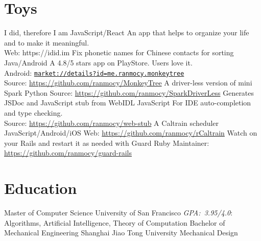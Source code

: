 \documentclass[]{friggeri-cv}
\begin{document}
\section{Toys}

\begin{entrylist}
  {I did, therefore I am}
  {JavaScript/React}
  {
    An app that helps to organize your life and to make it meaningful.\\
    Web: https://idid.im
  }
  {Fix phonetic names for Chinese contacts for sorting}
  {Java/Android}
  {
    A 4.8/5 stars app on PlayStore. Users love it.\\
    Android: \href{https://play.google.com/store/apps/details?id=me.ranmocy.monkeytree}{\texttt{market://details?id=me.ranmocy.monkeytree}}\\
    Source: \url{https://github.com/ranmocy/MonkeyTree}
  }
  {A driver-less version of mini Spark}
  {Python}
  {
    Source: \url{https://github.com/ranmocy/SparkDriverLess}
  }
  {Generates JSDoc and JavaScript stub from WebIDL}
  {JavaScript}
  {
    For IDE auto-completion and type checking.\\
    Source: \url{https://github.com/ranmocy/web-stub}
  }
  {A Caltrain scheduler}
  {JavaScript/Android/iOS}
  {
    Web: \url{https://github.com/ranmocy/rCaltrain}
  }
  {Watch on your Rails and restart it as needed with Guard}
  {Ruby}
  {
    Maintainer: \url{https://github.com/ranmocy/guard-rails}
  }
\end{entrylist}


\section{Education}

\begin{entrylist}
  {Master \textnormal{of Computer Science}}
  {University of San Francisco}
  {
    \emph{GPA:~3.95/4.0}: Algorithms, Artificial Intelligence, Theory of Computation
  }
  {Bachelor \textnormal{of Mechanical Engineering}}
  {Shanghai Jiao Tong University}
  {
    Mechanical Design
  }
\end{entrylist}
\end{document}
